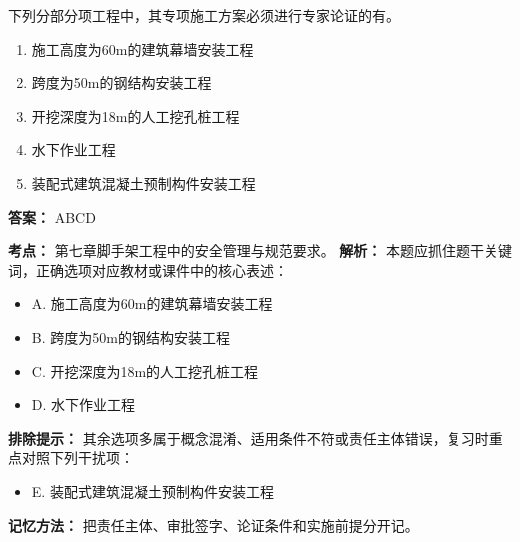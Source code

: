 \documentclass[UTF8,fontset=fandol,11pt]{ctexart}
\begin{document}
\begin{quizbox}[title={第 7 题}]
下列分部分项工程中，其专项施工方案必须进行专家论证的有。\\
\begin{enumerate}[label=\Alph*.]
\item 施工高度为60m的建筑幕墙安装工程
\item 跨度为50m的钢结构安装工程
\item 开挖深度为18m的人工挖孔桩工程
\item 水下作业工程
\item 装配式建筑混凝土预制构件安装工程
\end{enumerate}
\textbf{答案：} ABCD
\vspace{0.25em}
\begin{answerbox}[title={考点解析}]
\textbf{考点：} 第七章脚手架工程中的安全管理与规范要求。
\textbf{解析：} 本题应抓住题干关键词，正确选项对应教材或课件中的核心表述：
\begin{itemize}
\item A. 施工高度为60m的建筑幕墙安装工程
\item B. 跨度为50m的钢结构安装工程
\item C. 开挖深度为18m的人工挖孔桩工程
\item D. 水下作业工程
\end{itemize}
\textbf{排除提示：} 其余选项多属于概念混淆、适用条件不符或责任主体错误，复习时重点对照下列干扰项：
\begin{itemize}
\item E. 装配式建筑混凝土预制构件安装工程
\end{itemize}
\textbf{记忆方法：} 把责任主体、审批签字、论证条件和实施前提分开记。
\end{answerbox}
\end{quizbox}

\vspace{0.2em}
\end{document}
